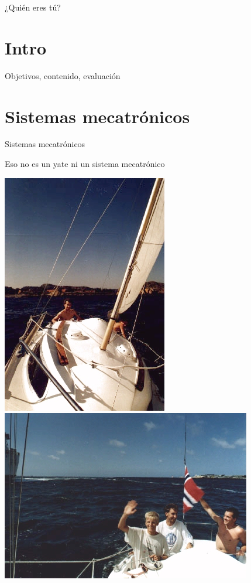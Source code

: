 \documentclass[presentation,aspectratio=169]{beamer}
\begin{document}
\begin{frame}[label={sec:org55179bd}]{¿Quién eres tú?}
\end{frame}


\section{Intro}
\label{sec:orga5b41e2}
\begin{frame}[label={sec:org86b4e7b}]{Objetivos, contenido, evaluación}
\end{frame}


\section{Sistemas mecatrónicos}
\label{sec:orge6612b7}

\begin{frame}[label={sec:orgd1cc3b9}]{Sistemas mecatrónicos}
\end{frame}

\begin{frame}[label={sec:org3632ace}]{Eso \alert{no} es un yate ni un sistema mecatrónico}
\begin{center}
\includegraphics[height=0.6\textheight]{../../figures/red-heat-1.jpeg}
\includegraphics[height=0.6\textheight]{../../figures/red-heat-2.jpeg}
\end{center}
\end{frame}
\end{document}
